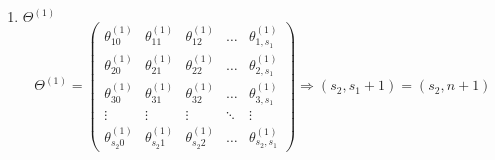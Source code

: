 \begin{enumerate}
\item $\Theta^{(1)}$
\begin{equation}
\Theta^{(1)} = 
	\left(\begin{matrix}
		\theta_{10}^{(1)} & \theta_{11}^{(1)} & \theta_{12}^{(1)} & \dots & \theta_{1,s_1}^{(1)} \\
		\theta_{20}^{(1)} & \theta_{21}^{(1)} & \theta_{22}^{(1)} & \dots & \theta_{2,s_1}^{(1)} \\
		\theta_{30}^{(1)} & \theta_{31}^{(1)} & \theta_{32}^{(1)} & \dots & \theta_{3,s_1}^{(1)} \\
		\vdots    & \vdots    & \vdots    & \ddots & \vdots   \\
		\theta_{s_{2}0}^{(1)} & \theta_{s_{2}1}^{(1)} & \theta_{s_{2}2}^{(1)} & \dots & \theta_{s_{2},s_{1}}^{(1)}
	\end{matrix}\right) \Rightarrow {(s_{2},s_1+1)=(s_{2},n+1)}
\end{equation}


\end{enumerate}
